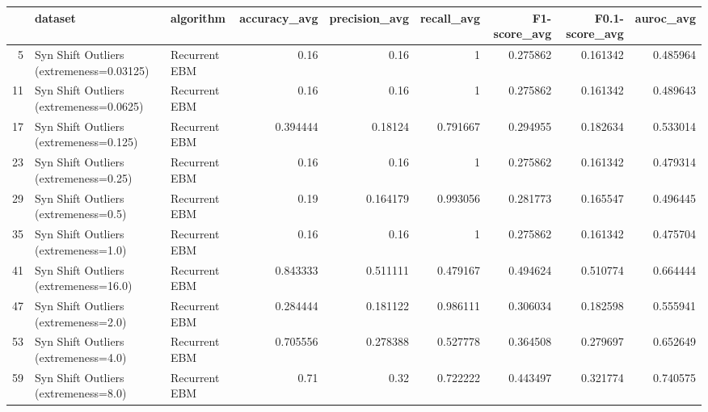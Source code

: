 \begin{tabular}{rllrrrrrr}
\hline
    & dataset                                  & algorithm     &   accuracy\_avg &   precision\_avg &   recall\_avg &   F1-score\_avg &   F0.1-score\_avg &   auroc\_avg \\
\hline
  5 & Syn Shift Outliers (extremeness=0.03125) & Recurrent EBM &       0.16     &        0.16     &     1        &       0.275862 &         0.161342 &    0.485964 \\
 11 & Syn Shift Outliers (extremeness=0.0625)  & Recurrent EBM &       0.16     &        0.16     &     1        &       0.275862 &         0.161342 &    0.489643 \\
 17 & Syn Shift Outliers (extremeness=0.125)   & Recurrent EBM &       0.394444 &        0.18124  &     0.791667 &       0.294955 &         0.182634 &    0.533014 \\
 23 & Syn Shift Outliers (extremeness=0.25)    & Recurrent EBM &       0.16     &        0.16     &     1        &       0.275862 &         0.161342 &    0.479314 \\
 29 & Syn Shift Outliers (extremeness=0.5)     & Recurrent EBM &       0.19     &        0.164179 &     0.993056 &       0.281773 &         0.165547 &    0.496445 \\
 35 & Syn Shift Outliers (extremeness=1.0)     & Recurrent EBM &       0.16     &        0.16     &     1        &       0.275862 &         0.161342 &    0.475704 \\
 41 & Syn Shift Outliers (extremeness=16.0)    & Recurrent EBM &       0.843333 &        0.511111 &     0.479167 &       0.494624 &         0.510774 &    0.664444 \\
 47 & Syn Shift Outliers (extremeness=2.0)     & Recurrent EBM &       0.284444 &        0.181122 &     0.986111 &       0.306034 &         0.182598 &    0.555941 \\
 53 & Syn Shift Outliers (extremeness=4.0)     & Recurrent EBM &       0.705556 &        0.278388 &     0.527778 &       0.364508 &         0.279697 &    0.652649 \\
 59 & Syn Shift Outliers (extremeness=8.0)     & Recurrent EBM &       0.71     &        0.32     &     0.722222 &       0.443497 &         0.321774 &    0.740575 \\
\hline
\end{tabular}

